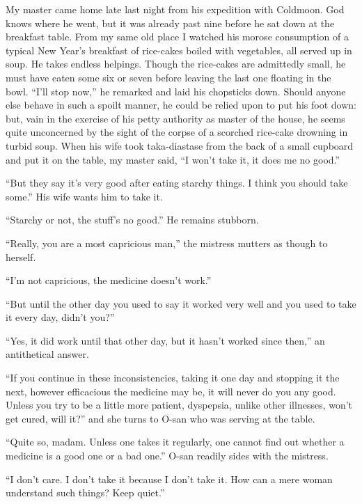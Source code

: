 \documentclass{book}
\begin{document}
My master came home late last night from his expedition with Coldmoon.
God knows where he went, but it was already past nine before he sat down
at the breakfast table. From my same old place I watched his morose
consumption of a typical New Year's breakfast of rice-cakes boiled with
vegetables, all served up in soup. He takes endless helpings. Though the
rice-cakes are admittedly small, he must have eaten some six or seven
before leaving the last one floating in the bowl. ``I'll stop now,'' he
remarked and laid his chopsticks down. Should anyone else behave in such
a spoilt manner, he could be relied upon to put his foot down: but, vain
in the exercise of his petty authority as master of the house, he seems
quite unconcerned by the sight of the corpse of a scorched rice-cake
drowning in turbid soup. When his wife took taka-diastase from the back
of a small cupboard and put it on the table, my master said, ``I won't
take it, it does me no good.''

``But they say it's very good after eating starchy things. I think you
should take some.'' His wife wants him to take it.

``Starchy or not, the stuff's no good.'' He remains stubborn.

``Really, you are a most capricious man,'' the mistress mutters as
though to herself.

``I'm not capricious, the medicine doesn't work.''

``But until the other day you used to say it worked very well and you
used to take it every day, didn't you?''

``Yes, it did work until that other day, but it hasn't worked since
then,'' an antithetical answer.

``If you continue in these inconsistencies, taking it one day and
stopping it the next, however efficacious the medicine may be, it will
never do you any good. Unless you try to be a little more patient,
dyspepsia, unlike other illnesses, won't get cured, will it?'' and she
turns to O-san who was serving at the table.

``Quite so, madam. Unless one takes it regularly, one cannot find out
whether a medicine is a good one or a bad one.'' O-san readily sides
with the mistress.

``I don't care. I don't take it because I don't take it. How can a mere
woman understand such things? Keep quiet.''
\end{document}
